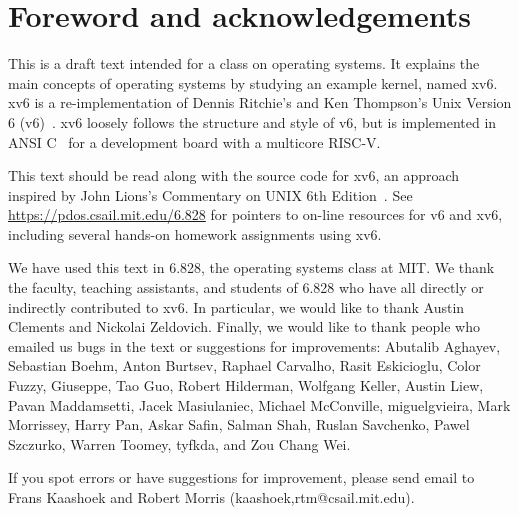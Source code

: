 \chapter*{Foreword and acknowledgements}


This is a draft text intended for a class on operating systems. It
explains the main concepts of operating systems by studying an example
kernel, named xv6.  xv6 is a re-implementation of Dennis Ritchie's and
Ken Thompson's Unix Version 6 (v6)~\cite{unix}.  xv6 loosely follows the structure
and style of v6, but is implemented in ANSI C~\cite{kernighan} for a development board
with a multicore RISC-V.

This text should be read along with the source code for xv6, an approach 
inspired by John Lions's Commentary on UNIX 6th Edition~\cite{lions}. See
\url{https://pdos.csail.mit.edu/6.828} for pointers to on-line
resources for v6 and xv6, including several hands-on homework assignments
using xv6.

We have used this text in 6.828, the operating systems class at MIT.  We thank
the faculty, teaching assistants, and students of 6.828 who have all directly or
indirectly contributed to xv6.  In particular, we would like to thank Austin
Clements and Nickolai Zeldovich.  Finally, we would like to thank people who
emailed us bugs in the text or suggestions for improvements: Abutalib Aghayev,
Sebastian Boehm, Anton Burtsev, Raphael Carvalho, Rasit Eskicioglu, Color Fuzzy,
Giuseppe, Tao Guo, Robert Hilderman, Wolfgang Keller, Austin Liew, Pavan
Maddamsetti, Jacek Masiulaniec, Michael McConville, miguelgvieira, Mark
Morrissey, Harry Pan, Askar Safin, Salman Shah, Ruslan Savchenko, Pawel
Szczurko, Warren Toomey, tyfkda, and Zou Chang Wei.

If you spot errors or have suggestions for improvement, please send email to
Frans Kaashoek and Robert Morris (kaashoek,rtm@csail.mit.edu).
